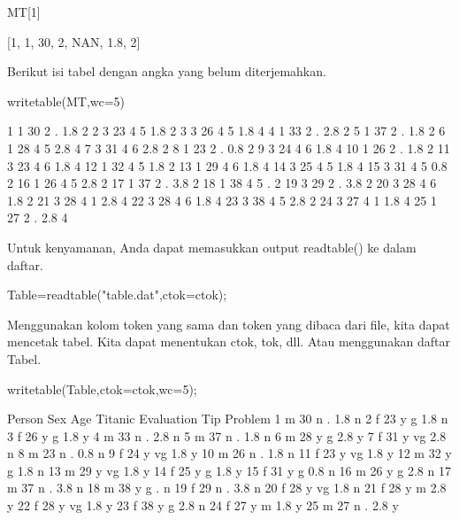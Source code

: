 \documentclass{article}
\begin{document}
\>MT[1]


    [1,  1,  30,  2,  NAN,  1.8,  2]

Berikut isi tabel dengan angka yang belum diterjemahkan.


\>writetable(MT,wc=5)


        1    1   30    2    .  1.8    2
        2    3   23    4    5  1.8    2
        3    3   26    4    5  1.8    4
        4    1   33    2    .  2.8    2
        5    1   37    2    .  1.8    2
        6    1   28    4    5  2.8    4
        7    3   31    4    6  2.8    2
        8    1   23    2    .  0.8    2
        9    3   24    4    6  1.8    4
       10    1   26    2    .  1.8    2
       11    3   23    4    6  1.8    4
       12    1   32    4    5  1.8    2
       13    1   29    4    6  1.8    4
       14    3   25    4    5  1.8    4
       15    3   31    4    5  0.8    2
       16    1   26    4    5  2.8    2
       17    1   37    2    .  3.8    2
       18    1   38    4    5    .    2
       19    3   29    2    .  3.8    2
       20    3   28    4    6  1.8    2
       21    3   28    4    1  2.8    4
       22    3   28    4    6  1.8    4
       23    3   38    4    5  2.8    2
       24    3   27    4    1  1.8    4
       25    1   27    2    .  2.8    4

Untuk kenyamanan, Anda dapat memasukkan output readtable() ke dalam
daftar.


\>Table={{readtable("table.dat",ctok=ctok)}};


Menggunakan kolom token yang sama dan token yang dibaca dari file,
kita dapat mencetak tabel. Kita dapat menentukan ctok, tok, dll. Atau
menggunakan daftar Tabel.


\>writetable(Table,ctok=ctok,wc=5);


     Person  Sex  Age Titanic Evaluation  Tip Problem
          1    m   30       n          .  1.8       n
          2    f   23       y          g  1.8       n
          3    f   26       y          g  1.8       y
          4    m   33       n          .  2.8       n
          5    m   37       n          .  1.8       n
          6    m   28       y          g  2.8       y
          7    f   31       y         vg  2.8       n
          8    m   23       n          .  0.8       n
          9    f   24       y         vg  1.8       y
         10    m   26       n          .  1.8       n
         11    f   23       y         vg  1.8       y
         12    m   32       y          g  1.8       n
         13    m   29       y         vg  1.8       y
         14    f   25       y          g  1.8       y
         15    f   31       y          g  0.8       n
         16    m   26       y          g  2.8       n
         17    m   37       n          .  3.8       n
         18    m   38       y          g    .       n
         19    f   29       n          .  3.8       n
         20    f   28       y         vg  1.8       n
         21    f   28       y          m  2.8       y
         22    f   28       y         vg  1.8       y
         23    f   38       y          g  2.8       n
         24    f   27       y          m  1.8       y
         25    m   27       n          .  2.8       y
\end{document}
